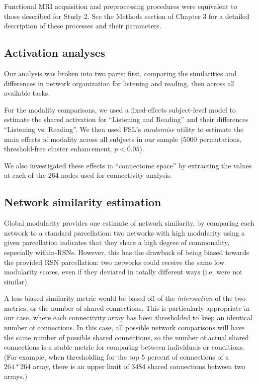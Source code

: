 Functional MRI acquisition and preprocessing procedures were equivalent to those described for Study 2. See the Methods section of Chapter 3 for a detailed description of these processes and their parameters.

\subsection{Activation analyses}

Our analysis was broken into two parts: first, comparing the similarities and differences in network organization for listening and reading, then across all available tasks. 

For the modality comparisons, we used a fixed-effects subject-level model to estimate the shared activation for ``Listening and Reading'' and their differences ``Listening vs. Reading''. We then used FSL's \textit{randomise} utility to estimate the main effects of modality across all subjects in our sample (5000 permutations, threshold-free cluster enhancement, $p < 0.05$).

We also investigated these effects in ``connectome space'' by extracting the values at each of the 264 nodes used for connectivity analysis. 


\subsection{Network similarity estimation}

Global modularity provides one estimate of network similarity, by comparing each network to a standard parcellation: two networks with high modularity using a given parcellation indicates that they share a high degree of commonality, especially within-RSNs. However, this has the drawback of being biased towards the provided RSN parcellation: two networks could receive the same low modularity scores, even if they deviated in totally different ways (i.e. were not similar). 

A less biased similarity metric would be based off of the \textit{intersection} of the two metrics, or the number of shared connections. This is particularly appropriate in our case, where each connectivity array has been thresholded to keep an identical number of connections. In this case, all possible network comparisons will have the same number of possible shared connections, so the number of actual shared connections is a stable metric for comparing between individuals or conditions. (For example, when thresholding for the top 5 percent of connections of a $264 * 264$ array, there is an upper limit of 3484 shared connections between two arrays.) 

